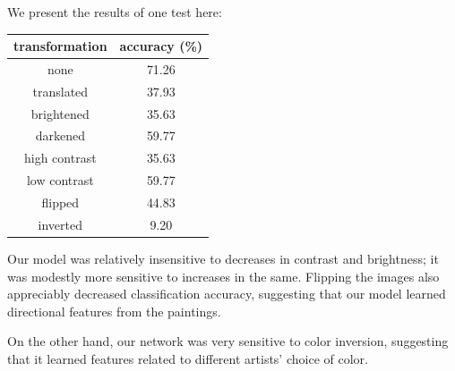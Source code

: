 \documentclass{article}
\begin{document}
\begin{multicols}{2}
We present the results of one test here:
\begin{center}
    \begin{tabular}{c|c}
        transformation & accuracy (\%) \\\hline
        none & 71.26 \\
        translated & 37.93\\
        brightened & 35.63\\
        darkened & 59.77\\
        high contrast & 35.63 \\
        low contrast &59.77\\
        flipped & 44.83\\
        inverted & 9.20
    \end{tabular}
\end{center}
Our model was relatively insensitive
to decreases in contrast and brightness;
it was modestly more sensitive to increases in the same.
Flipping the images also appreciably decreased classification accuracy,
suggesting that our model learned directional features from the paintings.

On the other hand,
our network was very sensitive to color inversion,
suggesting that it learned features
related to different artists' choice of color.

\end{multicols}
\end{document}
